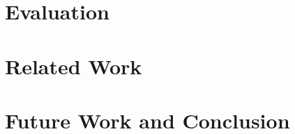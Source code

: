 \documentclass[11pt]{article}
\begin{document}
\section*{Evaluation}


\section*{Related Work}


\section*{Future Work and Conclusion}




\end{document}
